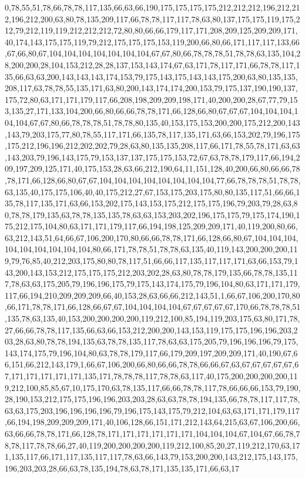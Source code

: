 0,78,55,51,78,66,78,78,117,135,66,63,66,190,175,175,175,175,212,212,212,196,212,212,196,212,200,63,80,78,135,209,117,66,78,78,117,117,78,63,80,137,175,175,119,175,212,79,212,119,119,212,212,212,72,80,80,66,66,179,117,171,208,209,125,209,209,171,40,174,143,175,175,119,79,212,175,175,175,153,119,200,66,80,66,171,117,117,133,66,67,66,80,67,104,104,104,104,104,104,104,67,67,80,66,78,78,78,51,78,78,63,135,104,28,200,200,28,104,153,212,28,28,137,153,143,174,67,63,171,78,117,171,66,78,78,117,135,66,63,63,200,143,143,143,174,153,79,175,143,175,143,143,175,200,63,80,135,135,208,117,63,78,78,55,135,171,63,80,200,143,174,174,200,153,79,175,137,190,190,137,175,72,80,63,171,171,179,117,66,208,198,209,209,198,171,40,200,200,28,67,77,79,153,135,27,171,133,104,200,66,80,66,66,78,78,171,66,128,66,80,67,67,67,104,104,104,104,104,67,67,80,66,78,78,78,51,78,78,80,135,40,153,175,153,200,200,175,212,200,143,143,79,203,175,77,80,78,55,117,171,66,135,78,117,135,171,63,66,153,202,79,196,175,175,212,196,196,212,202,202,79,28,63,80,135,135,208,117,66,171,78,55,78,171,63,63,143,203,79,196,143,175,79,153,137,137,175,175,153,72,67,63,78,78,179,117,66,194,209,197,209,125,171,40,175,153,28,63,66,212,190,64,11,151,128,40,200,66,80,66,66,78,78,171,66,128,66,80,67,67,104,104,104,104,104,104,104,104,77,66,78,78,78,51,78,78,63,135,40,175,175,106,40,40,175,212,27,67,153,175,203,175,80,80,135,117,51,66,66,135,78,117,135,171,63,66,153,202,175,143,153,175,212,175,175,196,79,203,79,28,63,80,78,78,179,135,63,78,78,135,135,78,63,63,153,203,202,196,175,175,79,175,174,190,175,212,175,104,80,63,171,171,179,117,66,194,198,125,209,209,171,40,119,200,80,66,63,212,143,51,64,66,67,106,200,170,80,66,66,78,78,171,66,128,66,80,67,104,104,104,104,104,104,104,104,104,80,66,171,78,78,51,78,78,63,135,40,119,143,200,200,200,119,79,76,85,40,212,203,175,80,80,78,117,51,66,66,117,135,117,117,171,63,66,153,79,143,200,143,153,212,175,175,175,212,203,202,28,63,80,78,78,179,135,66,78,78,135,117,78,63,63,175,205,79,196,196,175,79,175,143,174,175,79,196,104,80,63,171,171,179,117,66,194,210,209,209,209,66,40,153,28,63,66,66,212,143,51,1,66,67,106,200,170,80,66,171,78,78,171,66,128,66,67,67,104,104,104,104,67,67,67,67,67,170,66,78,78,78,51,135,78,63,135,40,153,200,200,200,200,119,212,100,85,194,119,203,175,63,80,171,78,27,66,66,78,78,117,135,66,63,66,153,212,200,200,143,153,119,175,175,196,196,203,203,28,63,80,78,78,194,135,63,78,78,135,117,78,63,63,175,205,79,196,196,196,79,175,143,174,175,79,196,104,80,63,78,78,179,117,66,179,209,197,209,209,171,40,190,67,66,151,66,212,143,179,1,66,67,106,200,66,80,66,66,78,78,66,66,67,63,67,67,67,67,67,67,171,171,171,171,171,135,171,78,78,78,117,78,78,63,117,40,175,200,200,200,200,119,212,100,85,85,67,10,175,170,63,78,135,117,66,66,78,78,117,78,66,66,66,153,79,190,28,190,153,212,175,175,196,196,203,203,28,63,63,78,78,194,135,66,78,78,117,117,78,63,63,175,203,196,196,196,196,79,196,175,143,175,79,212,104,63,63,171,171,179,117,66,194,198,209,209,209,171,40,106,128,66,151,171,212,143,64,215,63,67,106,200,66,63,66,66,78,78,171,66,128,78,171,171,171,171,171,171,104,104,104,67,104,67,66,78,78,78,117,78,78,66,27,40,119,200,200,200,200,119,212,100,85,20,27,119,212,170,63,171,135,117,66,171,117,135,117,117,78,63,66,143,79,153,200,200,143,212,175,143,175,196,203,203,28,66,63,78,135,194,78,63,78,171,135,135,171,66,63,17